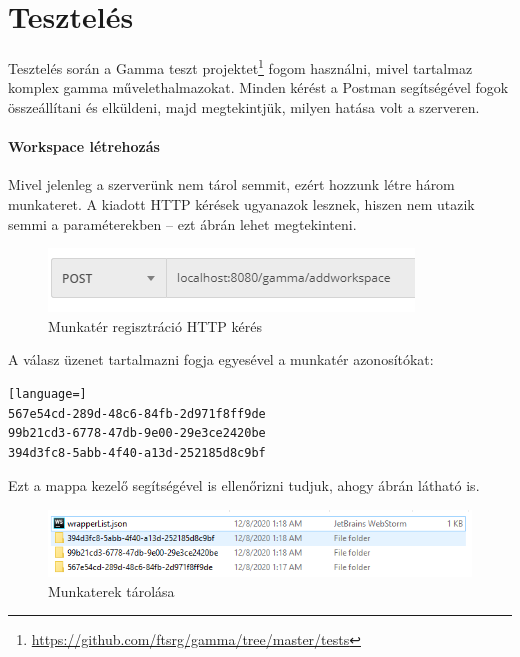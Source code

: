 \section{Tesztelés}

Tesztelés során a Gamma teszt projektet\footnote{\url{https://github.com/ftsrg/gamma/tree/master/tests}} fogom használni, mivel tartalmaz komplex gamma művelethalmazokat. Minden kérést a Postman segítségével fogok összeállítani és elküldeni, majd megtekintjük, milyen hatása volt a szerveren.

\paragraph{Workspace létrehozás} Mivel jelenleg a szerverünk nem tárol semmit, ezért hozzunk létre három munkateret. A kiadott HTTP kérések ugyanazok lesznek, hiszen nem utazik semmi a paraméterekben -- ezt  ábrán lehet megtekinteni.
\begin{figure}[!ht]
	\centering
	\includegraphics[keepaspectratio]{figures/addworkspace_test.PNG}
	\caption{Munkatér regisztráció HTTP kérés}
	\label{fig:addworkspace_test}
\end{figure}

\noindent A válasz üzenet tartalmazni fogja egyesével a  munkatér azonosítókat:
\begin{lstlisting}[language=]
567e54cd-289d-48c6-84fb-2d971f8ff9de
99b21cd3-6778-47db-9e00-29e3ce2420be
394d3fc8-5abb-4f40-a13d-252185d8c9bf
\end{lstlisting}

\noindent Ezt a mappa kezelő segítségével is ellenőrizni tudjuk, ahogy  ábrán látható is.

\begin{figure}[!ht]
	\includegraphics[width=\textwidth, keepaspectratio]{figures/workspace_infile.PNG}
	\caption{Munkaterek tárolása}
	\label{fig:workspace_infile}
\end{figure}

